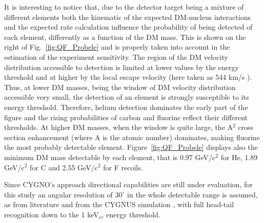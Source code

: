 \documentclass[physics,article,submit,moreauthors,pdftex]{Definitions/mdpi}
\begin{document}
It is interesting to notice that, due to the detector target being a mixture of different elements both the kinematic of the expected DM-nucleus interactions and the expected rate calculation influence the probability of being detected of each element, differently as a function of the DM mass. 
This is shown on the right of Fig.~\ref{fig:QF_Probele} and is properly taken into account in the estimation of the experiment sensitivity. The region of the DM velocity distribution accessible to detection is limited at lower values by the energy threshold and at higher by the local escape velocity (here taken as 544 km/s \cite{Smith_2007}). Thus, at lower DM masses, being the window of DM velocity distribution accessible very small, the detection of an element is strongly susceptible to its energy threshold. Therefore, helium detection dominates the early part of the figure and the rising probabilities of carbon and fluorine reflect their different thresholds. At higher DM masses, when  the window is quite large, the A$^2$ cross section enhancement  (where A is the atomic number) dominates, making fluorine the most probably detectable element. Figure~\ref{fig:QF_Probele} displays also the minimum DM mass detectable by each element, that is 0.97 GeV/c$^2$ for He, 1.89 GeV/c$^2$ for C and 2.55 GeV/c$^2$ for F recoils.


Since CYGNO's approach directional capabilities are still under evaluation, for this study an angular resolution of $30^\circ$ in the whole detectable range is assumed, as from literature \cite{Nakamura:2012zza} and from the CYGNUS simulation \cite{Vahsen:2020pzb}, with full head-tail recognition down to the 1 keV$_{ee}$ energy threshold.
 
 
\end{document}
